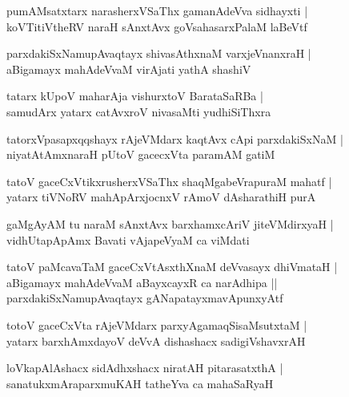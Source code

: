\documentclass[twoside,12pt,openright]{book}
\newcounter{shloka}[chapter]
\begin{document}
\begin{shloka}
pumAMsatxtarx narasherxVSaThx gamanAdeVva sidhayxti |\\
koVTitiVtheRV naraH sAnxtAvx goVsahasarxPalaM laBeVtf 
\end{shloka}

\begin{shloka}
parxdakiSxNamupAvaqtayx shivasAthxnaM varxjeVnanxraH |\\
aBigamayx mahAdeVvaM virAjati yathA shashiV 
\end{shloka}

\begin{shloka}
tatarx kUpoV maharAja vishurxtoV BarataSaRBa |\\
samudArx yatarx catAvxroV nivasaMti yudhiSiThxra 
\end{shloka}

\begin{shloka}
tatorxVpasapxqqshayx rAjeVMdarx kaqtAvx cApi parxdakiSxNaM |\\
niyatAtAmxnaraH pUtoV gacecxVta paramAM gatiM 
\end{shloka}

\begin{shloka}
tatoV gaceCxVtikxrusherxVSaThx shaqMgabeVrapuraM mahatf |\\
yatarx tiVNoRV mahApArxjocnxV rAmoV dAsharathiH purA 
\end{shloka}

\begin{shloka}
gaMgAyAM tu naraM sAnxtAvx barxhamxcAriV jiteVMdirxyaH |\\
vidhUtapApAmx Bavati vAjapeVyaM ca viMdati 
\end{shloka}

\begin{shloka}
tatoV paMcavaTaM gaceCxVtAsxthXnaM deVvasayx dhiVmataH |\\
aBigamayx mahAdeVvaM aBayxcayxR ca narAdhipa ||\\
parxdakiSxNamupAvaqtayx gANapatayxmavApunxyAtf 
\end{shloka}

\begin{shloka}
totoV gaceCxVta rAjeVMdarx parxyAgamaqSisaMsutxtaM |\\
yatarx barxhAmxdayoV deVvA dishashacx sadigiVshavxrAH 
\end{shloka}

\begin{shloka}
loVkapAlAshacx sidAdhxshacx niratAH pitarasatxthA |\\
sanatukxmAraparxmuKAH tatheYva ca mahaSaRyaH 
\end{shloka}
\end{document}
